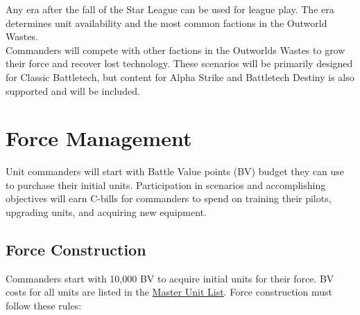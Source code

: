 \documentclass[UTF8]{article}
\begin{document}
Any era after the fall of the Star League can be used for league play.
The era determines unit availability and the most common factions in the Outworld Wastes.\\ 

Commanders will compete with other factions in the Outworlds Wastes to grow their force and recover lost technology.
These scenarios will be primarily designed for Classic Battletech, but content for Alpha Strike and Battletech Destiny is also supported and will be included.\\

\newpage

\section{Force Management}

Unit commanders will start with Battle Value points (BV) budget they can use to purchase their initial units.
Participation in scenarios and accomplishing objectives will earn C-bills for commanders to spend on training their pilots, upgrading units, and acquiring new equipment.

\subsection{Force Construction}

Commanders start with 10,000 BV to acquire initial units for their force.
BV costs for all units are listed in the \href{http://www.masterunitlist.info/}{Master Unit List}.
Force construction must follow these rules:\\
\end{document}
